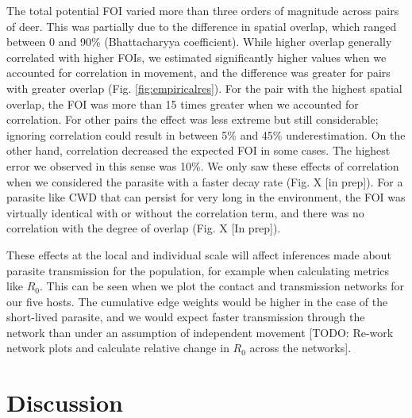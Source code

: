 \documentclass[letterpaper]{article}
\begin{document}
The total potential FOI varied more than three orders of magnitude across pairs of deer. This was partially due to the difference in spatial overlap, which ranged between 0 and 90\% (Bhattacharyya coefficient). While higher overlap generally correlated with higher FOIs, we estimated significantly higher values when we accounted for correlation in movement, and the difference was greater for pairs with greater overlap (Fig. \ref{fig:empiricalres}). For the pair with the highest spatial overlap, the FOI was more than 15 times greater when we accounted for correlation. For other pairs the effect was less extreme but still considerable; ignoring correlation could result in between 5\% and 45\% underestimation. On the other hand, correlation decreased the expected FOI in some cases. The highest error we observed in this sense was 10\%. 
We only saw these effects of correlation when we considered the parasite with a faster decay rate (Fig. X [in prep]). For a parasite like CWD that can persist for very long in the environment, the FOI was virtually identical with or without the correlation term, and there was no correlation with the degree of overlap (Fig. X [In prep]).

These effects at the local and individual scale will affect inferences made about parasite transmission for the population, for example when calculating metrics like $R_0$. This can be seen when we plot the contact and transmission networks for our five hosts. The cumulative edge weights would be higher in the case of the short-lived parasite, and we would expect faster transmission through the network than under an assumption of independent movement [TODO: Re-work network plots and calculate relative change in $R_0$ across the networks]. 


\section*{Discussion}
\end{document}
